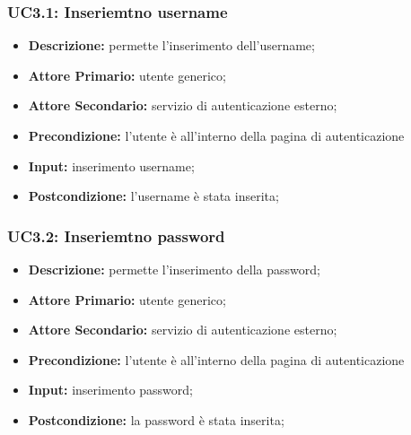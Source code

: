 \subsubsection{UC3.1: Inseriemtno username}
\label{sec:UC3.1}
\begin{itemize}
    \item \textbf{Descrizione:} permette l'inserimento dell'username;
    \item \textbf{Attore Primario:} utente generico;
    \item \textbf{Attore Secondario:} servizio di autenticazione esterno;
    \item \textbf{Precondizione:} l'utente è all'interno della pagina di autenticazione
    \item \textbf{Input:} inserimento username;
    \item \textbf{Postcondizione:} l'username è stata inserita;
\end{itemize}
\subsubsection{UC3.2: Inseriemtno password}
\label{sec:UC3.2}
\begin{itemize}
    \item \textbf{Descrizione:} permette l'inserimento della password;
    \item \textbf{Attore Primario:} utente generico;
    \item \textbf{Attore Secondario:} servizio di autenticazione esterno;
    \item \textbf{Precondizione:} l'utente è all'interno della pagina di autenticazione
    \item \textbf{Input:} inserimento password;
    \item \textbf{Postcondizione:} la password è stata inserita;
\end{itemize}
